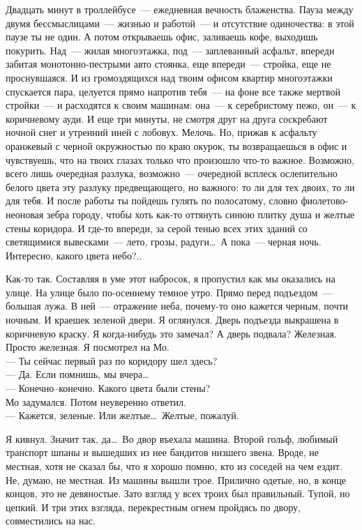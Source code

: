 Двадцать минут в троллейбусе~--- ежедневная вечность блаженства. Пауза между 
двумя бессмыслицами~--- жизнью и работой~--- и отсутствие одиночества: в этой паузе 
ты не один. А потом открываешь офис, заливаешь кофе, выходишь покурить. Над~--- жилая 
многоэтажка, под~--- заплеванный асфальт, впереди забитая монотонно-пестрыми 
авто стоянка, еще впереди~--- стройка, еще не проснувшаяся. И из громоздящихся над 
твоим офисом квартир многоэтажки спускается пара, целуется прямо напротив 
тебя~--- на фоне все также мертвой стройки~--- и расходятся к своим машинам: она~--- к 
серебристому пежо, он~--- к коричневому ауди. И еще три минуты, не смотря друг 
на друга соскребают ночной снег и утренний иней с лобовух. Мелочь. Но, прижав к 
асфальту оранжевый с черной окружностью по краю окурок, ты возвращаешься в офис 
и чувствуешь, что на твоих глазах только что произошло что-то важное. Возможно, 
всего лишь очередная разлука, возможно~--- очередной всплеск ослепительно 
белого цвета эту разлуку предвещающего, но важного: то ли для тех двоих, то ли для 
тебя. И после работы ты пойдешь гулять по полосатому, словно фиолетово-неоновая 
зебра городу, чтобы хоть как-то оттянуть синюю плитку душа и желтые стены 
коридора. И где-то впереди, за серой тенью всех этих зданий со светящимися 
вывесками~--- лето, грозы, радуги\ldots\ А пока~--- черная ночь. Интересно, 
какого цвета небо?..

\newpage

Как-то так. Составляя в уме этот набросок, я пропустил как мы оказались на 
улице. На улице было по-осеннему темное утро. Прямо перед подъездом~--- большая 
лужа. В ней~--- отражение неба, почему-то оно кажется черным, почти ночным. И 
краешек зеленой двери. Я оглянулся. Дверь подъезда выкрашена в коричневую 
краску. Я когда-нибудь это замечал? А дверь подвала? Железная. Просто железная. 
Я посмотрел на Мо.\\
--- Ты сейчас первый раз по коридору шел здесь?\\
--- Да. Если помнишь, мы вчера\ldots\\
--- Конечно--конечно. Какого цвета были стены?\\
Мо задумался. Потом неуверенно ответил.\\
--- Кажется, зеленые. Или желтые\ldots\ Желтые, пожалуй.


Я кивнул. Значит так, да\ldots\ Во двор въехала машина. Второй гольф, любимый 
транспорт шпаны и вышедших из нее бандитов низшего звена. Вроде, не местная, 
хотя не сказал бы, что я хорошо помню, кто из соседей на чем ездит. Не, думаю, 
не местная. Из машины вышли трое. Прилично одетые, но, в конце концов, это не 
девяностые. Зато взгляд у всех троих был правильный. Тупой, но цепкий. И три 
этих взгляда, перекрестным огнем пройдясь по двору, совместились на нас.

